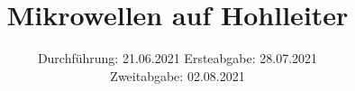 



\subject{V53}  %
\title{Mikrowellen auf Hohlleiter} %
\date{%
  Durchführung: 21.06.2021
  \hspace{3em}
  Ersteabgabe: 28.07.2021 
  \\
  \vspace{1em}
  Zweitabgabe: 02.08.2021
}



\maketitle
\thispagestyle{empty}
\tableofcontents
\newpage







\printbibliography{}


